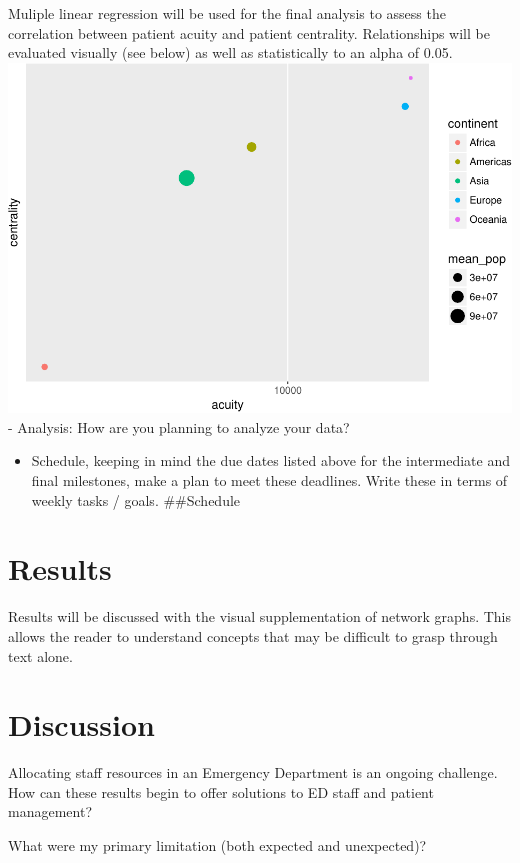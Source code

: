 \documentclass[]{elsarticle} %
\makeatletter
\providecommand{\tightlist}{%
  \setlength{\itemsep}{0pt}\setlength{\parskip}{0pt}}
\def\maxwidth{\ifdim\Gin@nat@width>\linewidth\linewidth
\else\Gin@nat@width\fi}
\let\Oldincludegraphics\includegraphics
\renewcommand{\includegraphics}[1]{\Oldincludegraphics[width=\maxwidth]{#1}}
\makeatother
\begin{document}
Muliple linear regression will be used for the final analysis to assess
the correlation between patient acuity and patient centrality.
Relationships will be evaluated visually (see below) as well as
statistically to an alpha of 0.05.
\includegraphics{Flynn_Project_files/figure-latex/unnamed-chunk-2-1.pdf}
- Analysis: How are you planning to analyze your data?

\begin{itemize}
\tightlist
\item
  Schedule, keeping in mind the due dates listed above for the
  intermediate and final milestones, make a plan to meet these
  deadlines. Write these in terms of weekly tasks / goals. \#\#Schedule
\end{itemize}

\section{Results}\label{results}

Results will be discussed with the visual supplementation of network
graphs. This allows the reader to understand concepts that may be
difficult to grasp through text alone.

\section{Discussion}\label{discussion}

Allocating staff resources in an Emergency Department is an ongoing
challenge. How can these results begin to offer solutions to ED staff
and patient management?

What were my primary limitation (both expected and unexpected)?
\end{document}
